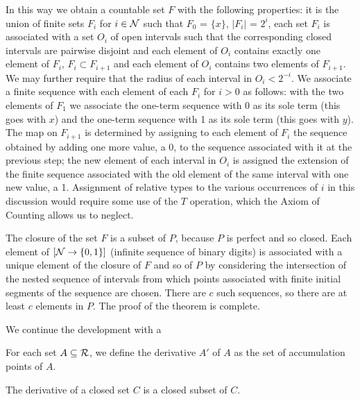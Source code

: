 In this way we obtain a countable set $F$ with the following
properties: it is the union of finite sets $F_i$ for $i \in
{\cal N}$ 
such that $F_0$ = $\{x\}$, $|F_i|$ = $2^i$, each set $F_i$ is
associated with a set $O_i$ of open intervals such that the
corresponding closed intervals are pairwise disjoint
and each element 
of $O_i$ contains exactly one element of $F_i$, $F_i \subset F_{i+1}$
and each element of $O_i$ contains two elements of $F_{i+1}$.  We may
further require that the radius of each interval in $O_i < 2^{-i}$.
We associate a finite sequence with each element of each
$F_i$ for $i>0$ as follows: with the two elements of $F_1$ we associate the
one-term sequence with 0 as its sole term (this goes with $x$) and the
one-term sequence with 1 as its sole term (this goes with $y$).
The map on $F_{i+1}$ is determined by assigning to each element of $F_i$
the sequence obtained by adding one more value, a 0, to the sequence
associated with it at the previous step; the new element of each
interval in $O_i$ is assigned the extension of the finite sequence
associated with the old element of the same interval with one new
value, a 1.  Assignment of relative types to the
various occurrences of $i$ in this discussion would require some use of the $T$
operation, which the Axiom of Counting allows us to
neglect. 

The closure of the set $F$ is a subset of $P$, because $P$ is perfect
and so closed.  Each element of $[{\cal N}\rightarrow \{0,1\}]$
(infinite sequence of binary digits) is associated
with a unique element of the closure of $F$ and so of $P$ by considering the
intersection of the nested
sequence of intervals from which points 
associated with finite initial
segments of the sequence are chosen. 
There are $c$ such sequences, so there are at least $c$ elements in
$P$.  The proof of the theorem is complete.
\finpreuve

We continue the development with a

\begin{definition}
 For each set $A \subseteq {\cal R}$, we define the
 {\upshape derivative} $A'$ of $A$ as the set of accumulation points of
 $A$.
\end{definition}

\begin{thm}
 The derivative of a closed set $C$ is a closed subset of $C$.
\end{thm}

